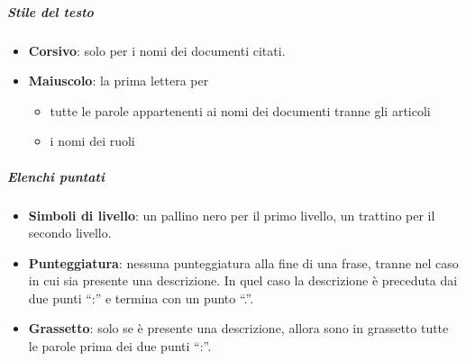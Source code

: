 			\subparagraph{Stile del testo}\label{PS:Documentazione:Design:NormeT:StileTesto}
			\begin{itemize}
				\item \textbf{Corsivo}: solo per i nomi dei documenti citati.
				\item \textbf{Maiuscolo}: la prima lettera per
				\begin{itemize}
					\item tutte le parole appartenenti ai nomi dei documenti tranne gli articoli
					\item i nomi dei ruoli
				\end{itemize}
			\end{itemize}

			\subparagraph{Elenchi puntati}\label{PS:Documentazione:Design:NormeT:ElenchiPuntati}
			\begin{itemize}
				\item \textbf{Simboli di livello}: un pallino nero per il primo livello, un trattino per il secondo livello.
				\item \textbf{Punteggiatura}: nessuna punteggiatura alla fine di una frase, tranne nel caso in cui sia presente una descrizione.
					In quel caso la descrizione è preceduta dai due punti ``:'' e termina con un punto ``.''.
				\item \textbf{Grassetto}: solo se è presente una descrizione, allora sono in grassetto tutte le parole prima dei due punti ``:''.
			\end{itemize}

